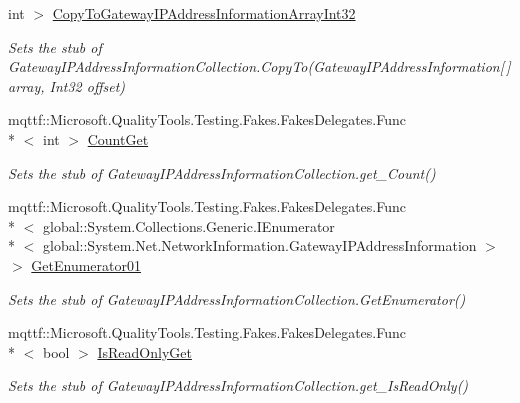 \begin{DoxyCompactItemize}
int $>$ \hyperlink{class_system_1_1_net_1_1_network_information_1_1_fakes_1_1_stub_gateway_i_p_address_information_collection_a3d5db5d1aeaad4f409ff01f5e1b8c46e}{Copy\-To\-Gateway\-I\-P\-Address\-Information\-Array\-Int32}
\begin{DoxyCompactList}\small\item\em Sets the stub of Gateway\-I\-P\-Address\-Information\-Collection.\-Copy\-To(\-Gateway\-I\-P\-Address\-Information\mbox{[}$\,$\mbox{]} array, Int32 offset)\end{DoxyCompactList}\item 
mqttf\-::\-Microsoft.\-Quality\-Tools.\-Testing.\-Fakes.\-Fakes\-Delegates.\-Func\\*
$<$ int $>$ \hyperlink{class_system_1_1_net_1_1_network_information_1_1_fakes_1_1_stub_gateway_i_p_address_information_collection_aded62117a8d70f50542fa6fd25089a62}{Count\-Get}
\begin{DoxyCompactList}\small\item\em Sets the stub of Gateway\-I\-P\-Address\-Information\-Collection.\-get\-\_\-\-Count()\end{DoxyCompactList}\item 
mqttf\-::\-Microsoft.\-Quality\-Tools.\-Testing.\-Fakes.\-Fakes\-Delegates.\-Func\\*
$<$ global\-::\-System.\-Collections.\-Generic.\-I\-Enumerator\\*
$<$ global\-::\-System.\-Net.\-Network\-Information.\-Gateway\-I\-P\-Address\-Information $>$ $>$ \hyperlink{class_system_1_1_net_1_1_network_information_1_1_fakes_1_1_stub_gateway_i_p_address_information_collection_afbceca8f699e61d4261c5d20f6537303}{Get\-Enumerator01}
\begin{DoxyCompactList}\small\item\em Sets the stub of Gateway\-I\-P\-Address\-Information\-Collection.\-Get\-Enumerator()\end{DoxyCompactList}\item 
mqttf\-::\-Microsoft.\-Quality\-Tools.\-Testing.\-Fakes.\-Fakes\-Delegates.\-Func\\*
$<$ bool $>$ \hyperlink{class_system_1_1_net_1_1_network_information_1_1_fakes_1_1_stub_gateway_i_p_address_information_collection_add585b581df88297895caa9124678f2d}{Is\-Read\-Only\-Get}
\begin{DoxyCompactList}\small\item\em Sets the stub of Gateway\-I\-P\-Address\-Information\-Collection.\-get\-\_\-\-Is\-Read\-Only()\end{DoxyCompactList}\item 

\end{DoxyCompactItemize}

